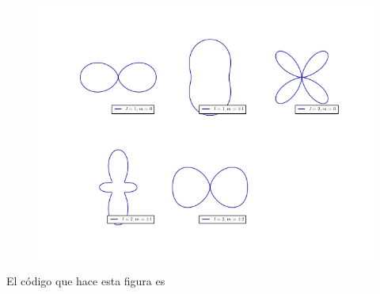 \documentclass[a4paper,11pt]{article}
\numberwithin{equation}{section}
\begin{document}
\begin{figure}[H]
 \center
 \includegraphics[scale=0.62]{problema3fig7}
\end{figure}

El código que hace esta figura es 
\end{document}
